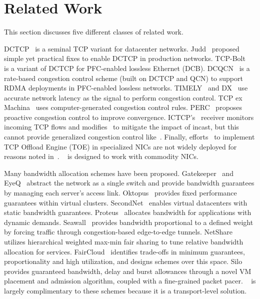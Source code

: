 \section{Related Work}
\label{related}
This section discusses five different classes of related work.

DCTCP~\cite{alizadeh2011data} is a seminal TCP variant for datacenter networks.
Judd~\cite{judd2015nsdi} proposed simple yet practical fixes to enable DCTCP in production networks.
TCP-Bolt~\cite{stephens2014practical} is a variant of DCTCP for PFC-enabled lossless Ethernet (DCB).
DCQCN~\cite{zhu2015congestion} is a rate-based congestion control scheme (built on DCTCP and QCN) to
support RDMA deployments in PFC-enabled lossless networks.
TIMELY~\cite{mittal2015timely} and DX~\cite{lee2015accurate} 
use accurate network latency as the signal to perform congestion control.
TCP ex Machina~\cite{winstein2013tcp} uses computer-generated congestion control rules.
PERC~\cite{jose2015high} proposes proactive congestion control to improve convergence.
ICTCP's~\cite{wu2010ictcp} receiver monitors incoming TCP flows and 
modifies~\rwnd{} to mitigate the impact of incast, but this cannot
provide generalized congestion control like~\acdc{}.
Finally, efforts~\cite{dell-toe,chelsio-toe} to 
implement TCP Offload Engine (TOE) in specialized NICs are not widely deployed for reasons noted in~\cite{mogul2003tcp,linux-toe}.
~\acdc{} is designed to work with commodity NICs. 

 Many bandwidth allocation schemes have been proposed.
Gatekeeper~\cite{rodrigues2011gatekeeper} and EyeQ~\cite{jeyakumar2013eyeq} abstract the network as a single
switch and provide bandwidth guarantees by managing each server's access link.
Oktopus~\cite{Ballani2011oktopus} provides fixed performance guarantees within virtual clusters.
SecondNet~\cite{Guo2010Secondnet} enables virtual datacenters with static bandwidth guarantees.
Proteus~\cite{Xie2012Proteus} allocates bandwidth for applications with dynamic demands.
Seawall~\cite{shieh2011sharing} provides bandwidth proportional to a defined weight by
forcing traffic through congestion-based edge-to-edge tunnels. 
NetShare~\cite{Lam2012NetShare} utilizes hierarchical weighted max-min fair sharing to tune relative bandwidth allocation for services.
FairCloud~\cite{Popa2012Faircloud} identifies trade-offs in minimum
guarantees, proportionality and high utilization, and designs schemes over this space.
Silo~\cite{jang2015silo} provides guaranteed bandwidth, delay and burst allowances through a novel VM placement and admission 
algorithm, coupled with a fine-grained packet pacer. 
~\acdc{} is largely complimentary to these schemes because it is a transport-level solution.

